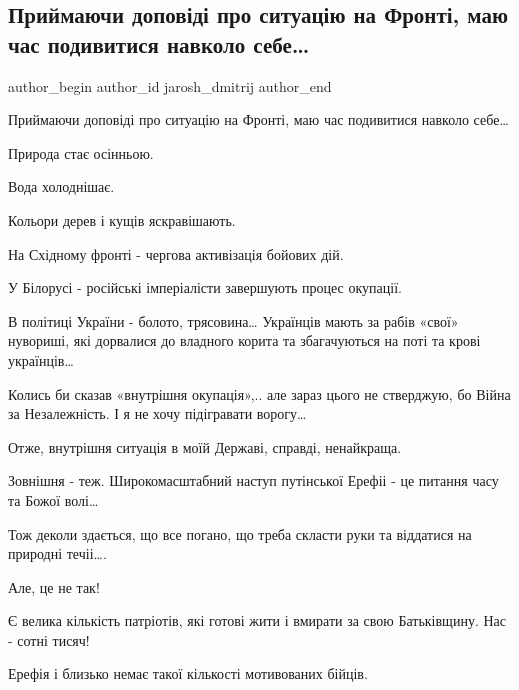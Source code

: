  
 
 
 
 
 
\subsection{Приймаючи доповіді про ситуацію на Фронті, маю час подивитися навколо себе…}
\label{sec:10_09_2021.fb.jarosh_dmitrij.1.vokrug_sebja}
 
\ifcmt
 author_begin
   author_id jarosh_dmitrij
 author_end
\fi

Приймаючи доповіді про ситуацію на Фронті, маю час подивитися навколо себе…

Природа стає осінньою.

Вода холоднішає.

Кольори дерев і кущів яскравішають.

На Східному фронті - чергова активізація бойових дій.

У Білорусі  -  російські імперіалісти завершують процес окупації.

В політиці України - болото, трясовина… Українців мають за рабів «свої»
нувориші, які дорвалися до владного корита та збагачуються на поті та крові
українців…

Колись би сказав «внутрішня окупація»,.. але зараз  цього не стверджую, бо
Війна за Незалежність. І я не хочу підігравати ворогу…

Отже, внутрішня ситуація в моїй Державі, справді, ненайкраща. 

Зовнішня - теж. Широкомасштабний наступ путінської Ерефіі - це питання часу та
Божої волі…

Тож деколи здається, що все погано, що треба скласти руки та віддатися на
природні течіі…. 

Але, це не так!

Є велика кількість патріотів, які готові жити і вмирати за свою Батьківщину.
Нас - сотні тисяч!

Ерефія і близько немає такої кількості мотивованих бійців. 


